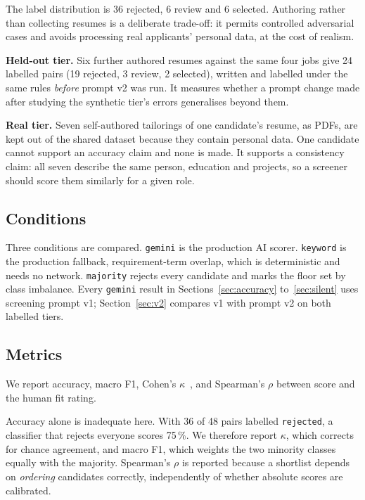 \documentclass[conference]{IEEEtran}
\begin{document}
The label distribution is 36 rejected, 6 review and 6 selected. Authoring rather
than collecting resumes is a deliberate trade-off: it permits controlled
adversarial cases and avoids processing real applicants' personal data, at the
cost of realism.

\textbf{Held-out tier.} Six further authored resumes against the same four jobs
give 24 labelled pairs (19 rejected, 3 review, 2 selected), written and labelled
under the same rules \textit{before} prompt v2 was run. It measures whether a
prompt change made after studying the synthetic tier's errors generalises beyond
them.

\textbf{Real tier.} Seven self-authored tailorings of one candidate's resume, as
PDFs, are kept out of the shared dataset because they contain personal data. One
candidate cannot support an accuracy claim and none is made. It supports a
consistency claim: all seven describe the same person, education and projects,
so a screener should score them similarly for a given role.

\subsection{Conditions}

Three conditions are compared. \texttt{gemini} is the production AI scorer.
\texttt{keyword} is the production fallback, requirement-term overlap, which is
deterministic and needs no network. \texttt{majority} rejects every candidate
and marks the floor set by class imbalance. Every \texttt{gemini} result in
Sections~\ref{sec:accuracy} to~\ref{sec:silent} uses screening prompt v1;
Section~\ref{sec:v2} compares v1 with prompt v2 on both labelled tiers.

\subsection{Metrics}
\label{sec:metrics}

We report accuracy, macro F1, Cohen's $\kappa$~\cite{b24}, and Spearman's
$\rho$ between score and the human fit rating.

Accuracy alone is inadequate here. With 36 of 48 pairs labelled
\texttt{rejected}, a classifier that rejects everyone scores 75\,\%. We therefore
report $\kappa$, which corrects for chance agreement, and macro F1, which weights
the two minority classes equally with the majority. Spearman's $\rho$ is
reported because a shortlist depends on \textit{ordering} candidates correctly,
independently of whether absolute scores are calibrated.
\end{document}

